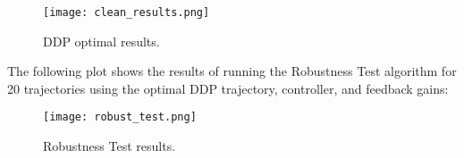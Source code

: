 \documentclass[11pt]{homework}
\begin{document}
\begin{arabicparts}
		\begin{figure}[H]
			\centering
			\texttt{[image: clean\_results.png]}
			\caption{DDP optimal results.}
		\end{figure}
		
	The following plot shows the results of running the Robustness Test algorithm for 20 trajectories using the optimal DDP trajectory, controller, and feedback gains:
	
		\begin{figure}[H]
			\centering
			\texttt{[image: robust\_test.png]}
			\caption{Robustness Test results.}
		\end{figure}

\end{arabicparts}

	
\end{document}

